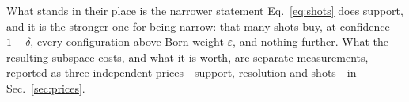 What stands in their place is the narrower statement Eq.~\eqref{eq:shots} does support, and it is the stronger
one for being narrow: that many shots buy, at confidence $1-\delta$, every configuration above Born
weight $\varepsilon$, and nothing further. What the resulting subspace costs, and what it is worth, are
separate measurements, reported as three independent prices---support, resolution and shots---in
Sec.~\ref{sec:prices}.

